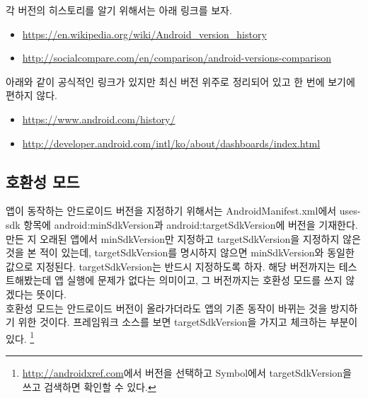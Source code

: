 각 버전의 히스토리를 알기 위해서는 아래 링크를 보자.
\begin{itemize}
\item \url{https://en.wikipedia.org/wiki/Android_version_history}
\item \url{http://socialcompare.com/en/comparison/android-versions-comparison}
\end{itemize}
아래와 같이 공식적인 링크가 있지만 최신 버전 위주로 정리되어 있고 한 번에 보기에 편하지 않다.
\begin{itemize}
\item \url{https://www.android.com/history/}
\item \url{http://developer.android.com/intl/ko/about/dashboards/index.html}
\end{itemize}

\subsection{호환성 모드}
앱이 동작하는 안드로이드 버전을 지정하기 위해서는 AndroidManifest.xml에서 uses-sdk 항목에  android:min\-SdkVersion과 android:targetSdkVersion에 버전을 기재한다. 
만든 지 오래된 앱에서 minSdkVersion만 지정하고 targetSdkVersion을 지정하지 않은 것을 본 적이 있는데, targetSdkVersion를 명시하지 않으면 minSdkVersion와 동일한 값으로 지정된다.
targetSdkVersion는 반드시 지정하도록 하자. 해당 버전까지는 테스트해봤는데 앱 실행에 문제가 없다는 의미이고, 그 버전까지는 호환성 모드를 쓰지 않겠다는 뜻이다.\\

호환성 모드는 안드로이드 버전이 올라가더라도 앱의 기존 동작이 바뀌는 것을 방지하기 위한 것이다.
프레임워크 소스를 보면 targetSdkVersion을 가지고 체크하는 부분이 있다.
\footnote{\url{http://androidxref.com}에서 버전을 선택하고 Symbol에서 targetSdkVersion을 쓰고 검색하면 확인할 수 있다.}\\

